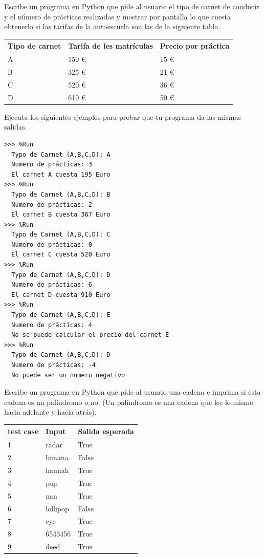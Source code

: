 \begin{ejercicio}Escribe un programa en Python que pide al usuario el tipo de carnet de conducir y el número de prácticas realizadas y mostrar por pantalla lo que cuesta obtenerlo si las tarifas de la autoescuela son las de la siguiente tabla.

\begin{tabular}{|l|l|l|}
\hline
Tipo de carnet & Tarifa   de les matrículas & Precio   por práctica \\
\hline\hline
A              & 150   €                    & 15   €                \\
\hline
B              & 325   €                    & 21   €                \\
\hline
C              & 520   €                    & 36   €                \\
\hline
D              & 610   €                    & 50   €  \\
\hline
\end{tabular}

Ejecuta los siguientes ejemplos para probar que tu programa da las mismas salidas.\\

\begin{Verbatim}[frame=single, label={\em ejemplos y posibles tests de ejecución}]
>>> %Run 
  Typo de Carnet (A,B,C,D): A
  Numero de prácticas: 3
  El carnet A cuesta 195 Euro
>>> %Run 
  Typo de Carnet (A,B,C,D): B
  Numero de prácticas: 2
  El carnet B cuesta 367 Euro
>>> %Run 
  Typo de Carnet (A,B,C,D): C
  Numero de prácticas: 0
  El carnet C cuesta 520 Euro
>>> %Run 
  Typo de Carnet (A,B,C,D): D
  Numero de prácticas: 6
  El carnet D cuesta 910 Euro
>>> %Run 
  Typo de Carnet (A,B,C,D): E
  Numero de prácticas: 4
  No se puede calcular el precio del carnet E
>>> %Run 
  Typo de Carnet (A,B,C,D): D
  Numero de prácticas: -4
  No puede ser un numero negativo
\end{Verbatim}
\end{ejercicio}

\begin{ejercicio}Escribe un programa en Python que pide al usuario una cadena e imprima si esta cadena es un palíndromo o no. (Un palíndromo es una cadena que lee lo mismo hacia adelante y hacia atrás). \\

\begin{tabular}{|l|l|l|}
\hline
test case & Input & Salida esperada \\
\hline\hline
1 & radar & True \\
2 & banana & False \\
3 & hannah & True \\
4 & pup &  True \\
5 & nan &  True \\
6 & lollipop & False \\
7 & eye & True \\
8 & 6543456 & True \\
9 & deed & True \\
\hline
\end{tabular}
\end{ejercicio}


